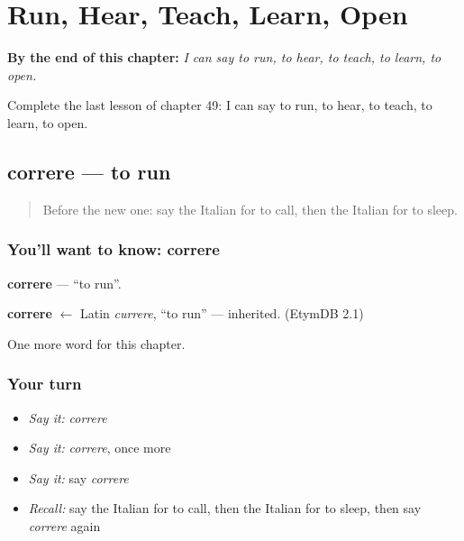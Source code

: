 
\chapter{Run, Hear, Teach, Learn, Open}
\label{ch:it-run-hear-teach-learn-open}

\begin{chapteropening}
\textbf{By the end of this chapter:} \emph{I can say to run, to hear, to teach, to learn, to open.}

Complete the last lesson of chapter 49: I can say to run, to hear, to teach, to learn, to open.
\end{chapteropening}

\section[correre]{correre — to run}

\label{lesson:IT-C49-correre}



\begin{quote}
Before the new one: say the Italian for to call, then the Italian for to sleep.
\end{quote}

\subsection*{You'll want to know: correre}
\textbf{correre} — \textquotedblleft{}to run\textquotedblright{}.

\begin{cousinweb}
\textbf{correre} $\leftarrow$ Latin \emph{currere}, \textquotedblleft{}to run\textquotedblright{} — inherited. (EtymDB 2.1)
\end{cousinweb}

\begin{grammarlens}[title={What you've built}]
One more word for this chapter.
\end{grammarlens}

\subsection*{Your turn}
\begin{itemize}
\raggedright
  \item \emph{Say it:} \emph{correre}
  \item \emph{Say it:} \emph{correre}, once more
  \item \emph{Say it:} say \emph{correre}
  \item \emph{Recall:} say the Italian for to call, then the Italian for to sleep, then say \emph{correre} again
\end{itemize}

